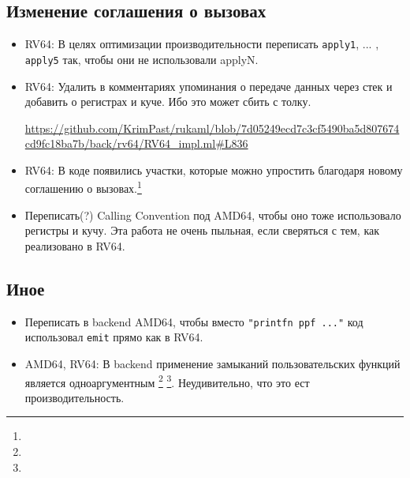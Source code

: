 \subsection{Изменение соглашения о вызовах}
\begin{itemize}
	\item RV64: В целях оптимизации производительности переписать \texttt{apply1}, ... , \texttt{apply5} так, чтобы они не использовали applyN.
	\item RV64: Удалить в комментариях упоминания о передаче данных через стек и добавить о регистрах и куче. Ибо это может сбить с толку.

\urldef{\urlsimlify}\url{https://github.com/KrimPast/rukaml/blob/7d05249ecd7c3cf5490ba5d807674cd9fc18ba7b/back/rv64/RV64_impl.ml#L836}

	\item RV64: В коде появились участки, которые можно упростить благодаря новому соглашению о вызовах.\footnote{\urlsimlify}
	\item Переписать(?) Calling Convention под AMD64, чтобы оно тоже использовало регистры и кучу. Эта работа не очень пыльная, если сверяться с тем, как реализовано в RV64.
\end{itemize}

\subsection{Иное}
\begin{itemize}
	
\urldef{\urlargonerv}\url{https://github.com/KrimPast/rukaml/blob/7d05249ecd7c3cf5490ba5d807674cd9fc18ba7b/back/rv64/RV64_impl.ml#L1094}
\urldef{\urlargoneamd}\url{https://github.com/KrimPast/rukaml/blob/7d05249ecd7c3cf5490ba5d807674cd9fc18ba7b/back/amd64/amd64_impl.ml#L906-L908}
	\item Переписать в backend AMD64, чтобы вместо \texttt{"printfn ppf ..."} код использовал \texttt{emit} прямо как в RV64.
	\item AMD64, RV64: В backend применение замыканий пользовательских функций является одноаргументным \footnote{\urlargonerv} \footnote{\urlargoneamd}. Неудивительно, что это ест производительность.
\end{itemize}

{\begin{itemize}}
	{\end{itemize}}
{\item}

\nocite{*}
\printbibliography[heading=bibnumbered, title={Полезные источники}, env=itemize]
